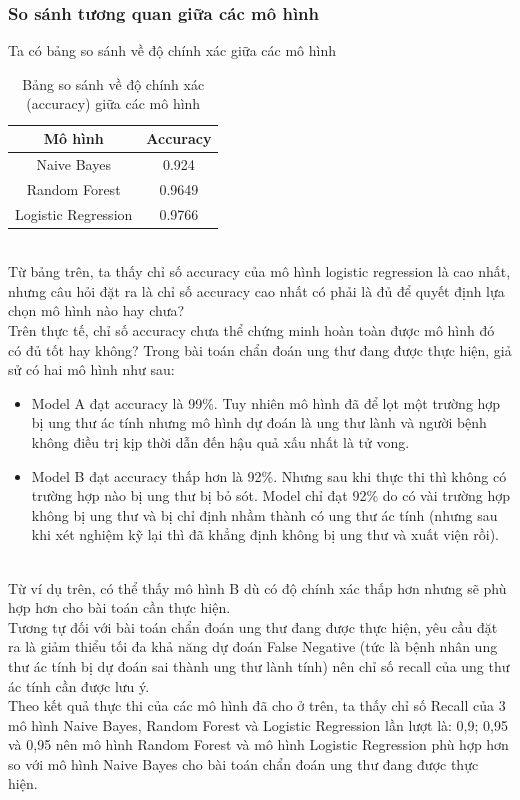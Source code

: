 \subsubsection{So sánh tương quan giữa các mô hình}
Ta có bảng so sánh về độ chính xác giữa các mô hình
\begin{table}[h]
    \centering
    \begin{tabular}{|c|c|}
    \hline
         Mô hình & Accuracy \\
         \hline
         Naive Bayes & 0.924\\
         \hline
         Random Forest & 0.9649\\
         \hline
         Logistic Regression & 0.9766\\
         \hline
    \end{tabular}
    \caption{Bảng so sánh về độ chính xác (accuracy) giữa các mô hình}
    \label{tab:my_label}
\end{table}
\\ Từ bảng trên, ta thấy chỉ số accuracy của mô hình logistic regression là cao nhất, nhưng câu hỏi đặt ra là chỉ số accuracy cao nhất có phải là đủ để quyết định lựa chọn mô hình nào hay chưa?
\\ Trên thực tế, chỉ số accuracy chưa thể chứng minh hoàn toàn được mô hình đó có đủ tốt hay không? Trong bài toán chẩn đoán ung thư đang được thực hiện, giả sử có hai mô hình như sau:
\begin{itemize}
    \item Model A đạt accuracy là 99\%. Tuy nhiên mô hình đã để lọt một trường hợp bị ung thư ác tính nhưng mô hình dự đoán là ung thư lành và người bệnh không điều trị kịp thời dẫn đến hậu quả xấu nhất là  tử vong. 
    \item Model B đạt accuracy thấp hơn là 92\%. Nhưng sau khi thực thi thì không có trường hợp nào bị ung thư bị bỏ sót. Model chỉ đạt 92\% do có vài trường hợp không bị ung thư và bị chỉ định nhầm thành có ung thư ác tính (nhưng sau khi xét nghiệm kỹ lại thì đã khẳng định không bị ung thư và xuất viện rồi).
\end{itemize}
\\ Từ ví dụ trên, có thể thấy mô hình B dù có độ chính xác thấp hơn nhưng sẽ phù hợp hơn cho bài toán cần thực hiện.  
\\ Tương tự đối với bài toán chẩn đoán ung thư đang được thực hiện, yêu cầu đặt ra là giảm thiểu tối đa khả năng dự đoán False Negative (tức là bệnh nhân ung thư ác tính bị dự đoán sai thành ung thư lành tính) nên chỉ số recall của ung thư ác tính cần được lưu ý.
\\ Theo kết quả thực thi của các mô hình đã cho ở trên, ta thấy chỉ số Recall của 3 mô hình Naive Bayes, Random Forest và Logistic Regression lần lượt là: 0,9; 0,95 và 0,95 nên mô hình Random Forest và mô hình Logistic Regression phù hợp hơn so với mô hình Naive Bayes cho bài toán chẩn đoán ung thư đang được thực hiện.